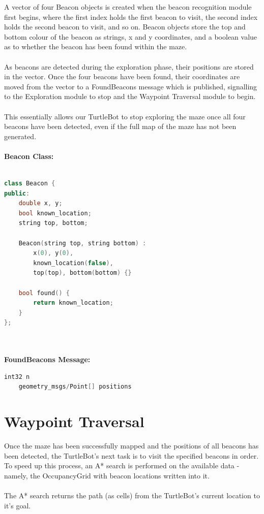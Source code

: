 \documentclass[titlepage,12pt,a4paper]{article}
\begin{document}
A vector of four Beacon objects is created when the beacon recognition module first begins, where the first index holds the first beacon to visit, the second index holds the second beacon to visit, and so on. Beacon objects store the top and bottom colour of the beacon as strings, x and y coordinates, and a boolean value as to whether the beacon has been found within the maze. \\
\\
As beacons are detected during the exploration phase, their positions are stored in the vector. Once the four beacons have been found, their coordinates are moved from the vector to a FoundBeacons message which is published, signalling to the Exploration module to stop and the Waypoint Traversal module to begin.\\
\\
This essentially allows our TurtleBot to stop exploring the maze once all four beacons have been detected, even if the full map of the maze has not been generated.\\
\\
\textbf{Beacon Class:}
\begin{lstlisting}[language=C++]

class Beacon {
public:
	double x, y;
	bool known_location;
	string top, bottom;
	
	Beacon(string top, string bottom) :
		x(0), y(0),
		known_location(false),
		top(top), bottom(bottom) {}
   
	bool found() {
		return known_location;
	}
};
	
\end{lstlisting}

\textbf{\\FoundBeacons Message:}
\begin{lstlisting}[language=C++]
	int32 n
	geometry_msgs/Point[] positions
\end{lstlisting}


\pagebreak


\section*{Waypoint Traversal}

Once the maze has been successfully mapped and the positions of all beacons has been detected, the TurtleBot's next task is to visit the specified beacons in order. To speed up this process, an A* search is performed on the available data - namely, the OccupancyGrid with beacon locations written into it.\\
\\
The A* search returns the path (as cells) from the TurtleBot's current location to it's goal.
\end{document}
